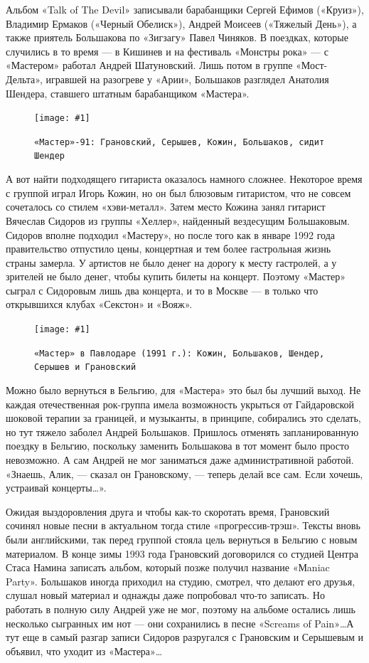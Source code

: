 \documentclass[16pt,a5paper]{book}
\newcommand{\myincludegraphics}[1]{\texttt{[image: \#1]}}
\begin{document}
Альбом «Talk of The Devil» записывали барабанщики Сергей Ефимов («Круиз»), Владимир Ермаков («Черный Обелиск»), Андрей
Моисеев («Тяжелый День»), а также приятель Большакова по «Зигзагу» Павел Чиняков. В поездках, которые случились в то
время — в Кишинев и на фестиваль «Монстры рока» — с «Мастером» работал Андрей Шатуновский. Лишь потом в группе
«Мост-Дельта», игравшей на разогреве у «Арии», Большаков разглядел Анатолия Шендера, ставшего штатным барабанщиком
«Мастера».

\begin{figure}[h]
    \centering
    \myincludegraphics{Image28}
    \caption{\texttt{«Мастер»-91: Грановский, Серышев, Кожин, Большаков, сидит Шендер}}
\end{figure}

А вот найти подходящего гитариста оказалось намного сложнее. Некоторое время с группой играл Игорь Кожин, но он был
блюзовым гитаристом, что не совсем сочеталось со стилем «хэви-металл». Затем место Кожина занял гитарист Вячеслав
Сидоров из группы «Хеллер», найденный вездесущим Большаковым. Сидоров вполне подходил «Мастеру», но после того как в
январе 1992 года правительство отпустило цены, концертная и тем более гастрольная жизнь страны замерла. У артистов не
было денег на дорогу к месту гастролей, а у зрителей не было денег, чтобы купить билеты на концерт. Поэтому «Мастер»
сыграл с Сидоровым лишь два концерта, и то в Москве — в только что открывшихся клубах «Секстон» и «Вояж».

\begin{figure}[h]
    \centering
    \myincludegraphics{Image29}
    \caption{\texttt{«Мастер» в Павлодаре (1991 г.): Кожин, Большаков, Шендер, Серышев и Грановский}}
\end{figure}

Можно было вернуться в Бельгию, для «Мастера» это был бы лучший выход. Не каждая отечественная рок-группа имела
возможность укрыться от Гайдаровской шоковой терапии за границей, и музыканты, в принципе, собирались это сделать, но
тут тяжело заболел Андрей Большаков. Пришлось отменять запланированную поездку в Бельгию, поскольку заменить Большакова
в тот момент было просто невозможно. А сам Андрей не мог заниматься даже административной работой. «Знаешь, Алик, —
сказал он Грановскому, — теперь делай все сам. Если хочешь, устраивай концерты\ldots».

Ожидая выздоровления друга и чтобы как-то скоротать время, Грановский сочинял новые песни в актуальном тогда стиле
«прогрессив-трэш». Тексты вновь были английскими, так перед группой стояла цель вернуться в Бельгию с новым материалом.
В конце зимы 1993 года Грановский договорился со студией Центра Стаса Намина записать альбом, который позже получил
название «Мaniac Party». Большаков иногда приходил на студию, смотрел, что делают его друзья, слушал новый материал и
однажды даже попробовал что-то записать. Но работать в полную силу Андрей уже не мог, поэтому на альбоме остались лишь
несколько сыгранных им нот — они сохранились в песне «Screams of Pain»\ldots А тут еще в самый разгар записи Сидоров
разругался с Грановским и Серышевым и объявил, что уходит из «Мастера»\ldots
\end{document}
